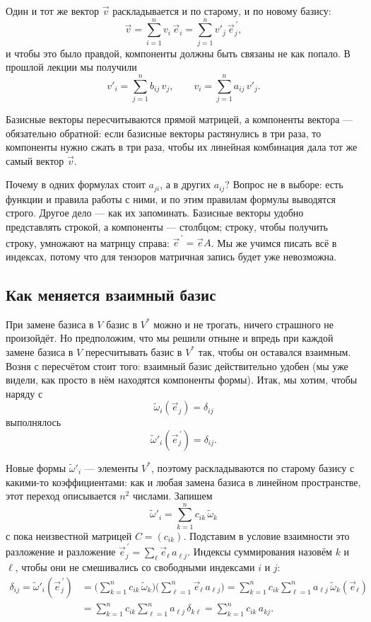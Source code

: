 \documentclass[11pt,a4paper]{article}
\begin{document}
Один и тот же вектор $\vec v$ раскладывается и по старому, и по новому базису:
\[
\vec v = \sum_{i=1}^n v_i\, \vec e_i = \sum_{j=1}^n v'_j\, \vec e^{\,\prime}_j,
\]
и чтобы это было правдой, компоненты должны быть связаны не как попало. В прошлой лекции мы получили
\[
v'_i = \sum_{j=1}^n b_{ij}\, v_j, \qquad v_i = \sum_{j=1}^n a_{ij}\, v'_j.
\]

Базисные векторы пересчитываются прямой матрицей, а компоненты вектора — обязательно обратной: если базисные векторы растянулись в три раза, то компоненты нужно сжать в три раза, чтобы их линейная комбинация дала тот же самый вектор $\vec v$.

Почему в одних формулах стоит $a_{ji}$, а в других $a_{ij}$? Вопрос не в выборе: есть функции и правила работы с ними, и по этим правилам формулы выводятся строго. Другое дело — как их запоминать. Базисные векторы удобно представлять строкой, а компоненты — столбцом; строку, чтобы получить строку, умножают на матрицу справа: $\vec e^{\,\prime} = \vec e A$. Мы же учимся писать всё в индексах, потому что для тензоров матричная запись будет уже невозможна.

\subsection{Как меняется взаимный базис}

При замене базиса в $V$ базис в $V^*$ можно и не трогать, ничего страшного не произойдёт. Но предположим, что мы решили отныне и впредь при каждой замене базиса в $V$ пересчитывать базис в $V^*$ так, чтобы он оставался взаимным. Возня с пересчётом стоит того: взаимный базис действительно удобен (мы уже видели, как просто в нём находятся компоненты формы). Итак, мы хотим, чтобы наряду с
\[
\tilde\omega_i(\vec e_j) = \delta_{ij}
\]
выполнялось
\[
\tilde\omega'_i(\vec e^{\,\prime}_j) = \delta_{ij}.
\]

Новые формы $\tilde\omega'_i$ — элементы $V^*$, поэтому раскладываются по старому базису с какими-то коэффициентами: как и любая замена базиса в линейном пространстве, этот переход описывается $n^2$ числами. Запишем
\[
\tilde\omega'_i = \sum_{k=1}^n c_{ik}\, \tilde\omega_k
\]
с пока неизвестной матрицей $C = (c_{ik})$. Подставим в условие взаимности это разложение и разложение $\vec e^{\,\prime}_j = \sum_{\ell} \vec e_\ell\, a_{\ell j}$. Индексы суммирования назовём $k$ и $\ell$, чтобы они не смешивались со свободными индексами $i$ и $j$:
\[
\begin{aligned}
\delta_{ij} = \tilde\omega'_i(\vec e^{\,\prime}_j)
&= \Big(\sum_{k=1}^n c_{ik}\, \tilde\omega_k\Big)\Big(\sum_{\ell=1}^n \vec e_\ell\, a_{\ell j}\Big)
= \sum_{k=1}^n c_{ik} \sum_{\ell=1}^n a_{\ell j}\, \tilde\omega_k(\vec e_\ell) \\
&= \sum_{k=1}^n c_{ik} \sum_{\ell=1}^n a_{\ell j}\, \delta_{k\ell}
= \sum_{k=1}^n c_{ik}\, a_{kj}.
\end{aligned}
\]
\end{document}
